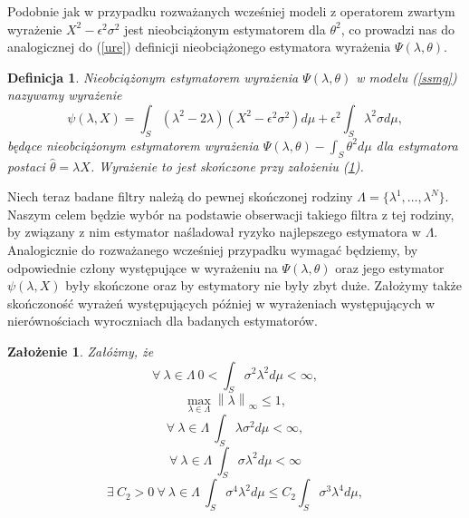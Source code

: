 \documentclass{mwart}
\newtheorem{df}{Definicja}
\newtheorem{za}{Założenie}
\newcommand{\norm}[1]{\left\lVert#1\right\rVert}
\begin{document}
Podobnie jak w przypadku rozważanych wcześniej modeli z operatorem zwartym wyrażenie $X^2-\epsilon^2\sigma^2$ jest nieobciążonym estymatorem dla $\theta^2$, co prowadzi nas do analogicznej do (\ref{ure}) definicji nieobciążonego estymatora wyrażenia $\Psi(\lambda,\theta)$.
\begin{df}
Nieobciążonym estymatorem wyrażenia $\Psi(\lambda,\theta)$ w modelu (\ref{ssmg}) nazywamy wyrażenie
\begin{equation}\label{ure1}
\psi(\lambda,X)=\int_S(\lambda^2-2\lambda)(X^2-\epsilon^2\sigma^2)d\mu+ \epsilon^2\int_S\lambda^2\sigma d\mu,
\end{equation}
będące nieobciążonym estymatorem wyrażenia $\Psi(\lambda,\theta)-\int_S\theta^2d\mu $ dla estymatora postaci $\hat{\theta}=\lambda X$. Wyrażenie to jest skończone przy założeniu (\ref{assbig}).
\end{df}
Niech teraz badane filtry należą do pewnej skończonej rodziny $\Lambda=\{\lambda^1,\dots ,\lambda^N\}$. Naszym celem będzie wybór na podstawie obserwacji takiego filtra z tej rodziny, by związany z nim estymator naśladował ryzyko najlepszego estymatora w $\Lambda$.\\
Analogicznie do rozważanego wcześniej przypadku wymagać będziemy, by odpowiednie człony występujące w wyrażeniu na $\Psi(\lambda,\theta)$  oraz jego estymator $\psi(\lambda, X)$ były skończone oraz by estymatory nie były zbyt duże. Założymy także skończoność wyrażeń występujących później w wyrażeniach występujących w nierównościach wyroczniach dla badanych estymatorów.
\begin{za}\label{assbig}
Załóżmy, że
\begin{displaymath}
\forall\ \lambda \in \Lambda\ 0<\int_S\sigma^2\lambda^2d\mu <\infty,
\end{displaymath}
\begin{displaymath}
\max_{\lambda \in \Lambda}\norm{\lambda}_{\infty}\leq 1,
\end{displaymath}
\begin{displaymath}
\forall\ \lambda \in \Lambda\ \int_S\lambda\sigma^2d\mu <\infty,
\end{displaymath}
\begin{displaymath}
\forall\ \lambda \in \Lambda\ \int_S\sigma\lambda^2d\mu<\infty
\end{displaymath}
\begin{displaymath}
\exists\ C_2>0\ \forall\ \lambda \in \Lambda\ \int_S \sigma^4\lambda^2 d\mu \leq C_2\int_S\sigma^3\lambda^4d\mu,
\end{displaymath}
\end{za}
\end{document}
